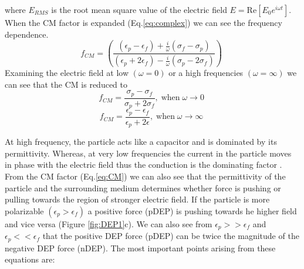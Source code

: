 \documentclass[draft]{jyflluk}
\begin{document}
%
where $E_{RMS}$ is the root mean square value of the electric field $E=\mathrm{Re}[E_0 e^{i \omega t}]$. When the CM factor is expanded (Eq.\ref{eq:complex}) we can see the frequency dependence.
%
\begin{equation}
   \label{eq:CM_open}
   f_{CM} = \left(\frac{(\epsilon_{p} - \epsilon_{f}) + \frac{i}{\omega} (\sigma_f - \sigma_p)}
   {(\epsilon_{p} + 2\epsilon_{f}) - \frac{i}{\omega} (\sigma_p - 2\sigma_f)} \right)\;
\end{equation}
%
Examining the electric field at low  $(\omega = 0)$ or a high frequencies $(\omega = \infty)$ we can see that the CM is reduced to 
\begin{equation}
   \label{eq:wat0}
   f_{CM} = \frac{\sigma_p - \sigma_f} {\sigma_p + 2\sigma_f}, \; \mathrm{when } \;\omega \rightarrow 0 \;
\end{equation}
\begin{equation}
   \label{eq:watinf}
   f_{CM} = \frac{\epsilon_p - \epsilon_f} {\epsilon_p + 2\epsilon}, \;\mathrm{when } \;\omega \rightarrow \infty\;
\end{equation}





At high frequency, the particle acts like a capacitor and is dominated by its permittivity. Whereas, at very low frequencies the current in the particle moves in phase with the electric field thus the conduction is the dominating factor \cite{cetin_dielectrophoresis_2011, li_review_2014, pethig_review_2010}. 
From the CM factor (Eq.\ref{eq:CM}) we can also see that the permittivity of the particle and the surrounding medium determines whether force is pushing or pulling towards the region of stronger electric field. If the particle is more polarizable $(\epsilon_p>\epsilon_f)$ a positive force (pDEP) is pushing towards he higher field and vice versa (Figure \ref{fig:DEP1}c). We can also see from $\epsilon_p>>\epsilon_f$ and  $\epsilon_p<<\epsilon_f $ that the positive DEP force (pDEP) can be twice the magnitude of the negative DEP force (nDEP).
The most important points arising from these equations are:
\end{document}
